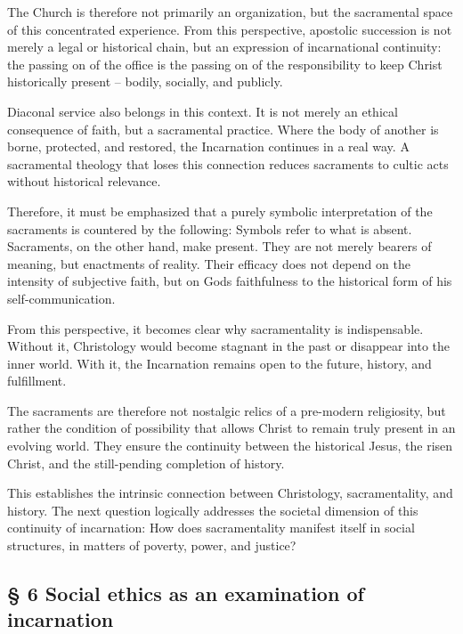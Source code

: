 \documentclass[
]{article}
\begin{document}
The Church is therefore not primarily an organization, but the sacramental space of this concentrated experience. From this perspective, apostolic succession is not merely a legal or historical chain, but an expression of incarnational continuity: the passing on of the office is the passing on of the responsibility to keep Christ historically present -- \hspace{0pt}\hspace{0pt}bodily, socially, and publicly.

Diaconal service also belongs in this context. It is not merely an ethical consequence of faith, but a sacramental practice. Where the body of another is borne, protected, and restored, the Incarnation continues in a real way. A sacramental theology that loses this connection reduces sacraments to cultic acts without historical relevance.

Therefore, it must be emphasized that a purely symbolic interpretation of the sacraments is countered by the following: Symbols refer to what is absent. Sacraments, on the other hand, make present. They are not merely bearers of meaning, but enactments of reality. Their efficacy does not depend on the intensity of subjective faith, but on God\textquotesingle s faithfulness to the historical form of his self-communication.

From this perspective, it becomes clear why sacramentality is indispensable. Without it, Christology would become stagnant in the past or disappear into the inner world. With it, the Incarnation remains open to the future, history, and fulfillment.

The sacraments are therefore not nostalgic relics of a pre-modern religiosity, but rather the condition of possibility that allows Christ to remain truly present in an evolving world. They ensure the continuity between the historical Jesus, the risen Christ, and the still-pending completion of history.

This establishes the intrinsic connection between Christology, sacramentality, and history. The next question logically addresses the societal dimension of this continuity of incarnation: How does sacramentality manifest itself in social structures, in matters of poverty, power, and justice?

\subsection{\texorpdfstring{\textbf{§ 6 Social ethics as an examination of incarnation}}{§ 6 Social ethics as an examination of incarnation}}\label{social-ethics-as-an-examination-of-incarnation}
\end{document}
